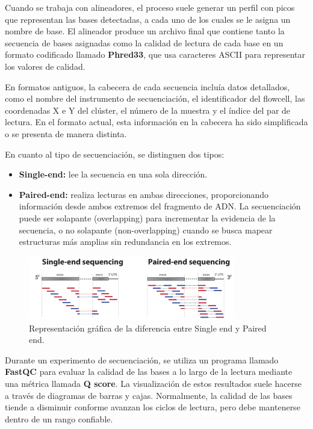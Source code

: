 Cuando se trabaja con alineadores, el proceso suele generar un perfil con picos que representan las bases detectadas, a cada uno de los cuales se le asigna un nombre de base. El alineador produce un archivo final que contiene tanto la secuencia de bases asignadas como la calidad de lectura de cada base en un formato codificado llamado \textbf{Phred33}, que usa caracteres ASCII para representar los valores de calidad.

En formatos antiguos, la cabecera de cada secuencia incluía datos detallados, como el nombre del instrumento de secuenciación, el identificador del flowcell, las coordenadas X e Y del clúster, el número de la muestra y el índice del par de lectura. En el formato actual, esta información en la cabecera ha sido simplificada o se presenta de manera distinta.

En cuanto al tipo de secuenciación, se distinguen dos tipos:
\begin{itemize}
\item \textbf{Single-end:} lee la secuencia en una sola dirección.
\item \textbf{Paired-end:} realiza lecturas en ambas direcciones, proporcionando información desde ambos extremos del fragmento de ADN. La secuenciación puede ser solapante (overlapping) para incrementar la evidencia de la secuencia, o no solapante (non-overlapping) cuando se busca mapear estructuras más amplias sin redundancia en los extremos.
\end{itemize}

\begin{figure}[htbp]
\centering
\includegraphics[width = 0.8\textwidth]{figs/singleEndVsPairedEnd.png}
\caption{Representación gráfica de la diferencia entre Single end y Paired end.}
\end{figure}

Durante un experimento de secuenciación, se utiliza un programa llamado \textbf{FastQC} para evaluar la calidad de las bases a lo largo de la lectura mediante una métrica llamada \textbf{Q score}. La visualización de estos resultados suele hacerse a través de diagramas de barras y cajas. Normalmente, la calidad de las bases tiende a disminuir conforme avanzan los ciclos de lectura, pero debe mantenerse dentro de un rango confiable.


